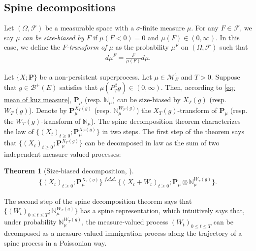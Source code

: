 \documentclass[12pt,a4paper]{amsart}
\newtheorem{thm}{Theorem}[section]
\theoremstyle{definition}
\numberwithin{equation}{section}
\begin{document}
\subsection{Spine decompositions}
\label{sec: Spine decompositions}
Let $(\Omega, \mathscr F)$ be a measurable space with a $\sigma$-finite measure $\mu$.
For any $F\in \mathscr F$, we say \emph{$\mu$ can be size-biased by $F$} if $\mu(F< 0) = 0$ and $\mu(F) \in (0,\infty)$.
In this case, we define the \emph{$F$-transform of $\mu$} as the probability $\mu^F$ on $(\Omega, \mathscr F)$ such that
\begin{align}	
	d\mu^F
	= \frac{F}{\mu(F)}d \mu.
\end{align}

Let $\{X;\mathbf P\}$ be a non-persistent superprocess.
Let $\mu \in \mathcal M^1_E$ and $T>0$.
Suppose that $g\in \mathscr B^+(E)$ satisfies that $\mu(P^\beta_Tg) \in (0,\infty)$.
Then, according to \eqref{eq: mean of kuz measure}, $\mathbf P_\mu$ (resp. $\mathbb N_\mu$) can be size-biased by $X_T(g)$ (resp. $W_T(g)$).
Denote by $\mathbf P_\mu^{X_T(g)}$ (resp. $\mathbb N^{W_T(g)}_\mu$) the $X_T(g)$-transform of $\mathbf P_\mu$ (resp. the $W_T(g)$-transform of $\mathbb N_\mu$).
The spine decomposition theorem characterizes the law of $\{(X_t)_{t\geq 0}; \mathbf P_\mu^{X_T(g)}\}$ in two steps.
The first step of the theorem says that $\{(X_t)_{t\geq 0}; \mathbf P_\mu^{X_T(g)}\}$ can be decomposed in law as the sum of two independent measure-valued processes:
	
\begin{thm}[Size-biased decomposition,  \cite{RenSongSun2017Spine}]\label{thm: size-biased decomposition}
  \begin{align}
    \{(X_t)_{t\geq 0}; \mathbf P_\mu^{X_T(g)}\}
    \overset{f.d.d.}{=} \{(X_t+W_t)_{t\geq 0}; \mathbf P_\mu  \otimes \mathbb N^{W_T(g)}_\mu\}.
  \end{align}
\end{thm}
The second step of the spine decomposition theorem says that $\{(W_t)_{0\leq t\leq T}; \mathbb N^{W_T(g)}_\mu\}$ has a spine representation, which intuitively says that, under probability $\mathbb N_\mu^{W_T(g)}$, 
the measure-valued process $(W_t)_{0\leq t\leq T}$ can be decomposed as a measure-valued immigration process along the trajectory of a spine process in a Poissonian way.
\end{document}
